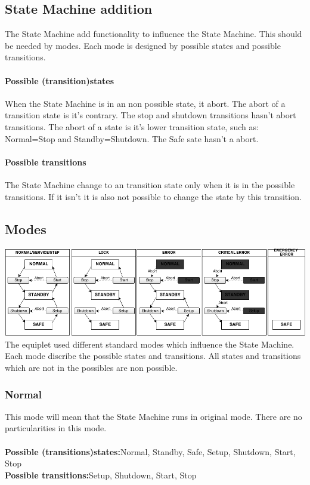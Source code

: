 \documentclass[12pt,a4paper]{report}
\begin{document}
\subsection{State Machine addition}
The State Machine add functionality to influence the State Machine. This should be needed by modes. Each mode is designed by possible states and possible transitions.
\paragraph{Possible (transition)states}When the State Machine is in an non possible state, it abort. The abort of a transition state is it's contrary. The stop and shutdown transitions hasn't abort transitions. The abort of a state is it's lower transition state, such as: Normal=Stop and Standby=Shutdown. The Safe sate hasn't a abort.
\paragraph{Possible transitions}The State Machine change to an transition state only when it is in the possible transitions. If it isn't it is also not possible to change the state by this transition.

\subsection{Modes}
\includegraphics[width=1\textwidth]{pictures/modes.png}\\
The equiplet used different standard modes which influence the State Machine. Each mode discribe the possible states and transitions. All states and transitions which are not in the possibles are non possible. 

\subsubsection{Normal}This mode will mean that the State Machine runs in original mode. There are no particularities in this mode.\\\\
\textbf{Possible (transitions)states:}Normal, Standby, Safe, Setup, Shutdown, Start, Stop\\
\textbf{Possible transitions:}Setup, Shutdown, Start, Stop
\end{document}
